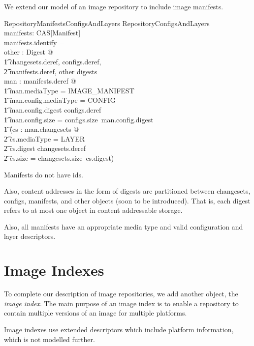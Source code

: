 \documentclass[a4paper,twoside,12pt]{article}
\begin{document}
We extend our model of an image repository to include image manifests.
\begin{schema}{RepositoryManifestsConfigsAndLayers}
  RepositoryConfigsAndLayers \\
  manifests: CAS[Manifest] \\
\where
  manifests.identify = \emptyset \\
\also
  \exists other : \power Digest @ \\
  \t1 \langle \dom changesets.deref, \dom configs.deref, \\
  \t2 \dom manifests.deref, other  \rangle \partition digests \\
\also
  \forall man : \ran manifests.deref @ \\
   \t1 man.mediaType = IMAGE\_MANIFEST \land \\
   \t1 man.config.mediaType = CONFIG \land \\
   \t1 man.config.digest \in \dom configs.deref \land \\
   \t1 man.config.size = configs.size~man.config.digest \land \\
   \t1 (\forall cs : \ran man.changesets @ \\
     \t2 cs.mediaType = LAYER \land \\
     \t2 cs.digest \in \dom changesets.deref \land \\
     \t2 cs.size = changesets.size~cs.digest) \\
\end{schema}
Manifests do not have ids.

Also, content addresses in the form of digests are partitioned between changesets, configs, manifests, and other objects (soon to be introduced).
That is, each digest refers to at most one object in content addressable storage.

Also, all manifests have an appropriate media type and valid configuration and layer descriptors.

\newpage
\section{Image Indexes}

To complete our description of image repositories, we add another object, the \textit{image index}. The main purpose of an image index is to
enable a repository to contain multiple versions of an image for multiple platforms.

Image indexes use extended descriptors which include platform information, which is not modelled further.
\begin{zed}
[ Platform ] 
\end{zed}
\end{document}
